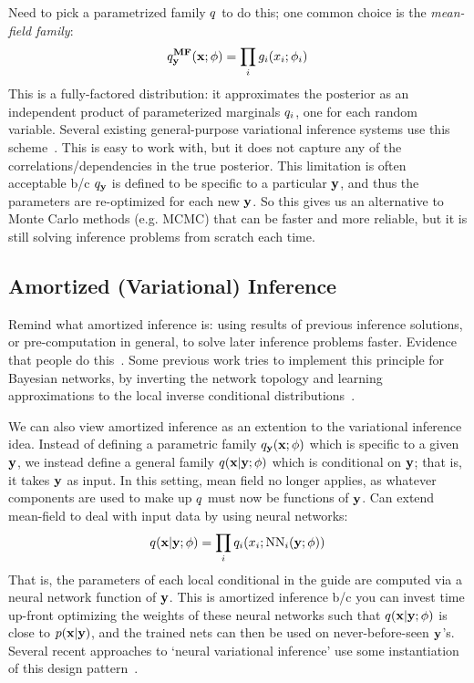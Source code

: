 Need to pick a parametrized family $q$ to do this; one common choice is the \emph{mean-field family}:
\begin{equation*}
q^{\textbf{MF}}_{\mathbf{y}}(\mathbf{x} ; \phi) = \prod_i g_i(x_i ; \phi_i)
\end{equation*}
This is a fully-factored distribution: it approximates the posterior as an independent product of parameterized marginals $q_i$, one for each random variable.
Several existing general-purpose variational inference systems use this scheme~\cite{AVIPP,BBVI}.
This is easy to work with, but it does not capture any of the correlations/dependencies in the true posterior.
This limitation is often acceptable b/c $q_{\mathbf{y}}$ is defined to be specific to a particular $\mathbf{y}$, and thus the parameters are re-optimized for each new $\mathbf{y}$.
So this gives us an alternative to Monte Carlo methods (e.g. MCMC) that can be faster and more reliable, but it is still solving inference problems from scratch each time.

\subsection{Amortized (Variational) Inference}

Remind what amortized inference is: using results of previous inference solutions, or pre-computation in general, to solve later inference problems faster.
Evidence that people do this~\cite{AmortizedInference}.
Some previous work tries to implement this principle for Bayesian networks, by inverting the network topology and learning approximations to the local inverse conditional distributions~\cite{StochasticInverses,NeuralStochasticInverses}.

We can also view amortized inference as an extention to the variational inference idea.
Instead of defining a parametric family $q_{\mathbf{y}}(\mathbf{x} ; \phi)$ which is specific to a given $\mathbf{y}$, we instead define a general family $q(\mathbf{x} | \mathbf{y} ; \phi)$ which is conditional on $\mathbf{y}$; that is, it takes $\mathbf{y}$ as input.
In this setting, mean field no longer applies, as whatever components are used to make up $q$ must now be functions of $\mathbf{y}$.
Can extend mean-field to deal with input data by using neural networks:
\begin{equation*}
q(\mathbf{x} | \mathbf{y} ; \phi) = \prod_i q_i(x_i ; \text{NN}_i(\mathbf{y} ; \phi))
\end{equation*}
That is, the parameters of each local conditional in the guide are computed via a neural network function of $\mathbf{y}$.
This is amortized inference b/c you can invest time up-front optimizing the weights of these neural networks such that $q(\mathbf{x} | \mathbf{y} ; \phi)$ is close to $p(\mathbf{x} | \mathbf{y})$, and the trained nets can then be used on never-before-seen $\mathbf{y}$'s.
Several recent approaches to `neural variational inference' use some instantiation of this design pattern~\cite{NVIL,DLGM,AEVB}.

